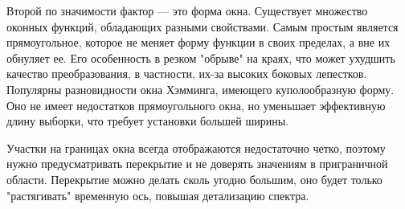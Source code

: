 Второй по значимости фактор --- это форма окна. Существует множество оконных функций, обладающих разными свойствами. Самым простым является прямоугольное, которое не меняет форму функции в своих пределах, а вне их обнуляет ее. Его особенность в резком "обрыве" на краях, что может ухудшить качество преобразования, в частности, их-за высоких боковых лепестков. Популярны разновидности окна Хэмминга, имеющего куполообразную форму. Оно не имеет недостатков прямоугольного окна, но уменьшает эффективную длину выборки, что требует установки большей ширины.

Участки на границах окна всегда отображаются недостаточно четко, поэтому нужно предусматривать перекрытие и не доверять значениям в приграничной области. Перекрытие можно делать сколь угодно большим, оно будет только "растягивать" временную ось, повышая детализацию спектра.
